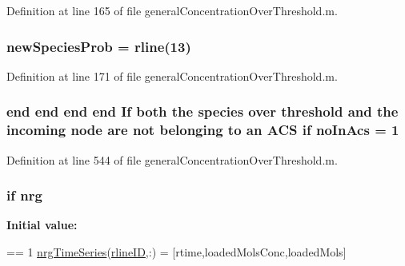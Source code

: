 Definition at line 165 of file general\-Concentration\-Over\-Threshold.\-m.

\hypertarget{a00028_aa66147edba72bc0b9cf591cd7475396f}{
\subsubsection[{new\-Species\-Prob}]{\setlength{\rightskip}{0pt plus 5cm}new\-Species\-Prob = {\bf rline}(13)}}\label{a00028_aa66147edba72bc0b9cf591cd7475396f}


Definition at line 171 of file general\-Concentration\-Over\-Threshold.\-m.

\hypertarget{a00028_ac45b9c97670e4b4e103ce174dc2db6b3}{
\subsubsection[{no\-In\-Acs}]{ {\bf end} {\bf end} {\bf end} {\bf end} If both the {\bf species} over {\bf threshold} {\bf and} the incoming node are not belonging {\bf to} an {\bf A\-C\-S} {\bf if} no\-In\-Acs = 1}}\label{a00028_ac45b9c97670e4b4e103ce174dc2db6b3}


Definition at line 544 of file general\-Concentration\-Over\-Threshold.\-m.

\hypertarget{a00028_af837f695e5b67c86016c1a82608c38b4}{
\subsubsection[{nrg}]{ {\bf if} nrg}}\label{a00028_af837f695e5b67c86016c1a82608c38b4}
{\bfseries Initial value\-:}
\begin{DoxyCode}
== 1
                    \hyperlink{a00028_ad5f4092827ae220bd7c53532aaaa0590}{nrgTimeSeries}(\hyperlink{a00028_a8443a49765859a8631fed7e8a1d27fe5}{rlineID},:) = [rtime,loadedMolsConc,loadedMols]
\end{DoxyCode}


